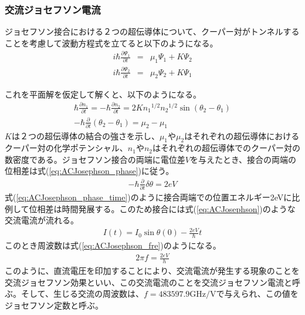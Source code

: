 		\subsubsection{交流ジョセフソン電流}
		ジョセフソン接合における２つの超伝導体について、クーパー対がトンネルすることを考慮して波動方程式を立てると以下のようになる。
		\begin{eqnarray}
			i \hbar \frac{\partial \Psi_{1}}{\partial t} & = & \mu_{1} \Psi_{1} + K \Psi_{2} \\
			i \hbar \frac{\partial \Psi_{2}}{\partial t} & = & \mu_{2} \Psi_{2} + K \Psi_{1}
			\label{eq:ACJosephson}
		\end{eqnarray}
		
		これを平面解を仮定して解くと、以下のようになる。
		\begin{eqnarray}
			\hbar \frac{\partial n_1}{\partial t} = - \hbar \frac{\partial n_2}{\partial t} = 2 K {n_1}^{1/2} {n_2}^{1/2} \sin (\theta_2 - \theta_1) \\
			- \hbar \frac{\partial}{\partial t} (\theta_2 - \theta_1) = \mu_2 - \mu_1
			\label{eq:ACJosephson_phase}
		\end{eqnarray}
		$K$は２つの超伝導体の結合の強さを示し、$\mu_1$や$\mu_2$はそれぞれの超伝導体におけるクーパー対の化学ポテンシャル、$n_1$や$n_2$はそれぞれの超伝導体でのクーパー対の数密度である。ジョセフソン接合の両端に電位差$V$を与えたとき、接合の両端の位相差は式(\ref{eq:ACJosephson_phase})に従う。
		\begin{eqnarray}
		- \hbar \frac{\partial}{\partial t} \delta \theta = 2eV
		\label{eq:ACJosephson_phase_time}
		\end{eqnarray}
		式(\ref{eq:ACJosephson_phase_time})のように接合両端での位置エネルギー2eVに比例して位相差は時間発展する。このため接合には式(\ref{eq:ACJosephson})のような交流電流が流れる。
		\begin{eqnarray}
			I(t) = I_{0} \sin { \theta (0) - \frac{2eV}{\hbar} t }
			\label{eq:ACJosephson}
		\end{eqnarray}
		このとき周波数は式(\ref{eq:ACJosephson_fre})のようになる。
		\begin{eqnarray}
			2 \pi f = \frac{2eV}{h}
			\label{eq:ACJosephson_fre}
		\end{eqnarray}
		このように、直流電圧を印加することにより、交流電流が発生する現象のことを交流ジョセフソン効果といい、この交流電流のことを交流ジョセフソン電流と呼ぶ。そして、生じる交流の周波数は、$f = 483597.9 \mathrm{GHz/V}$で与えられ、この値をジョセフソン定数と呼ぶ。
	
